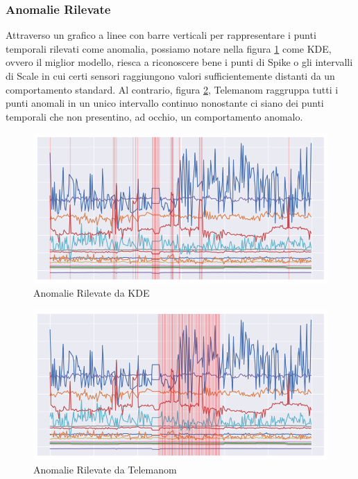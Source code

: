 \subsubsection{Anomalie Rilevate}
Attraverso un grafico a linee con barre verticali per rappresentare i punti temporali rilevati come anomalia, possiamo notare nella figura \ref{kde} come KDE, ovvero il miglior modello, riesca a riconoscere bene i punti di Spike o gli intervalli di Scale in cui certi sensori raggiungono valori sufficientemente distanti da un comportamento standard. Al contrario, figura \ref{worst_clf}, Telemanom raggruppa tutti i punti anomali in un unico intervallo continuo nonostante ci siano dei punti temporali che non presentino, ad occhio, un comportamento anomalo.

\begin{figure}[t]
	\centering
	\includegraphics[width=14cm, scale=1]{images/kde}
	\caption{Anomalie Rilevate da KDE}
	\label{kde}
	
\end{figure}

\begin{figure}[t]
	\centering
	\includegraphics[width=14cm, scale=1]{images/worst_clf}
	\caption{Anomalie Rilevate da Telemanom}
	\label{worst_clf}
	
\end{figure}

